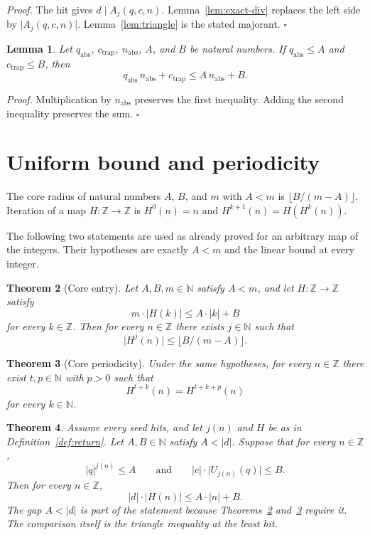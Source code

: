 \documentclass[11pt,letterpaper]{article}
\newcommand{\N}{\mathbb{N}}
\newcommand{\Z}{\mathbb{Z}}
\newtheorem{theorem}{Theorem}
\newtheorem{lemma}[theorem]{Lemma}
\newenvironment{proof}{\noindent\textit{Proof.}}{\hfill\(\square\)}
\begin{document}
\begin{proof}
The hit gives \(d\mid A_j(q,c,n)\). Lemma~\ref{lem:exact-div} replaces the left side by \(\lvert A_j(q,c,n)\rvert\). Lemma~\ref{lem:triangle} is the stated majorant.
\end{proof}

\begin{lemma}
\label{lem:absorb}
Let \(q_{\mathrm{abs}}\), \(c_{\mathrm{trap}}\), \(n_{\mathrm{abs}}\), \(A\), and \(B\) be natural numbers. If \(q_{\mathrm{abs}}\le A\) and \(c_{\mathrm{trap}}\le B\), then
\[
q_{\mathrm{abs}}\,n_{\mathrm{abs}}+c_{\mathrm{trap}}\le A\,n_{\mathrm{abs}}+B.
\]
\end{lemma}

\begin{proof}
Multiplication by \(n_{\mathrm{abs}}\) preserves the first inequality. Adding the second inequality preserves the sum.
\end{proof}

\section{Uniform bound and periodicity}

The core radius of natural numbers \(A\), \(B\), and \(m\) with \(A<m\) is \(\lfloor B/(m-A)\rfloor\). Iteration of a map \(H:\Z\to\Z\) is \(H^0(n)=n\) and \(H^{k+1}(n)=H(H^k(n))\).

The following two statements are used as already proved for an arbitrary map of the integers. Their hypotheses are exactly \(A<m\) and the linear bound at every integer.

\begin{theorem}[Core entry]
\label{thm:core-entry}
Let \(A,B,m\in\N\) satisfy \(A<m\), and let \(H:\Z\to\Z\) satisfy
\[
m\cdot\lvert H(k)\rvert\le A\cdot\lvert k\rvert+B
\]
for every \(k\in\Z\). Then for every \(n\in\Z\) there exists \(j\in\N\) such that
\[
\lvert H^j(n)\rvert\le \lfloor B/(m-A)\rfloor.
\]
\end{theorem}

\begin{theorem}[Core periodicity]
\label{thm:core-period}
Under the same hypotheses, for every \(n\in\Z\) there exist \(t,p\in\N\) with \(p>0\) such that
\[
H^{t+k}(n)=H^{t+k+p}(n)
\]
for every \(k\in\N\).
\end{theorem}

\begin{theorem}
\label{thm:uniform-bound}
Assume every seed hits, and let \(j(n)\) and \(H\) be as in Definition~\ref{def:return}. Let \(A,B\in\N\) satisfy \(A<\lvert d\rvert\). Suppose that for every \(n\in\Z\),
\[
\lvert q\rvert^{j(n)}\le A
\qquad\text{and}\qquad
\lvert c\rvert\cdot\lvert U_{j(n)}(q)\rvert\le B.
\]
Then for every \(n\in\Z\),
\[
\lvert d\rvert\cdot\lvert H(n)\rvert\le A\cdot\lvert n\rvert+B.
\]
The gap \(A<\lvert d\rvert\) is part of the statement because Theorems~\ref{thm:core-entry} and~\ref{thm:core-period} require it. The comparison itself is the triangle inequality at the least hit.
\end{theorem}
\end{document}
